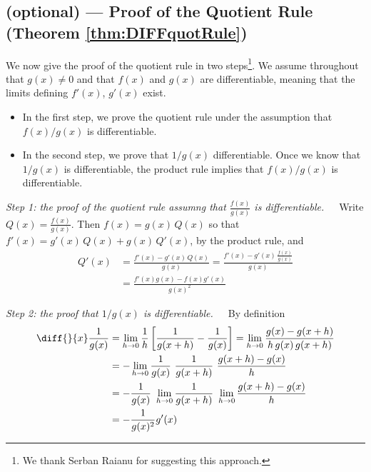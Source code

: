 \subsection*{(optional) --- Proof of the Quotient Rule
                (Theorem \ref{thm:DIFFquotRule})}

We now give the proof of the quotient rule in two steps\footnote{We thank
Serban Raianu for suggesting this approach.}. We assume throughout that 
$g(x) \neq 0$ and that $f(x)$ and $g(x)$ are differentiable, meaning 
that the limits defining $f'(x)$, $g'(x)$ exist.
\begin{itemize}
\item
In the first step, we prove the quotient rule under the assumption that $f(x)/g(x)$ is differentiable.
\item
In the second step, we prove that $1/g(x)$ differentiable. Once we know that 
$1/g(x)$ is differentiable, the product rule implies that $f(x)/g(x)$ is
differentiable. 
\end{itemize}

\noindent\emph{Step 1: the proof of the quotient rule assumng that 
$\frac{f(x)}{g(x)}$ is differentiable.}\ \ \ Write $Q(x)=\frac{f(x)}{g(x)}$. Then $f(x) = g(x)\,Q(x)$
so that $f'(x) = g'(x)\,Q(x) + g(x)\,Q'(x)$, by the product rule, and
\begin{align*}
Q'(x) &= \frac{f'(x)-g'(x)\,Q(x)}{g(x)}
       = \frac{f'(x)-g'(x)\,\frac{f(x)}{g(x)}}{g(x)} \\
      &= \frac{f'(x)g(x)-f(x)g'(x)}{g(x)^2}
\end{align*}

\noindent\emph{Step 2: the proof that $1/g(x)$ is differentiable.}\ \ \ 
By definition
\begin{align*}
\diff{}{x}\frac{1}{g(x)}
&=\lim_{h\rightarrow 0}\frac{1}{h}\left[\frac{1}{g(x+h)}-\frac{1}{g(x)}\right]
=\lim_{h\rightarrow 0}\frac{g(x)-g(x+h)}{h\,g(x)\,g(x+h)}
\\
&=-\lim_{h\rightarrow 0}\frac{1}{g(x)}\ \frac{1}{g(x+h)}\ 
                                        \frac{g(x+h)-g(x)}{h}\\
&=-\frac{1}{g(x)}\ 
   \lim_{h\rightarrow 0}\frac{1}{g(x+h)}\ 
   \lim_{h\rightarrow 0}\frac{g(x+h)-g(x)}{h}\\
&=-\frac{1}{g(x)^2}g'(x)
\end{align*}

